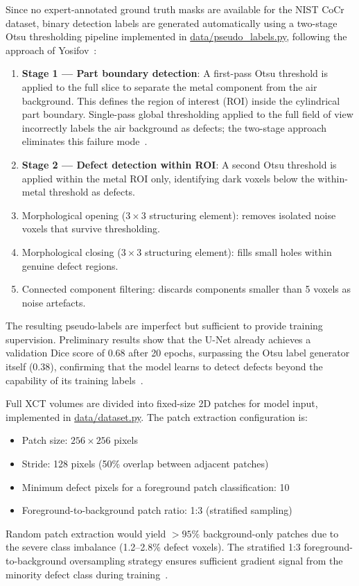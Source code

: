 Since no expert-annotated ground truth masks are available for the NIST CoCr dataset, binary
detection labels are generated automatically using a two-stage Otsu thresholding pipeline implemented
in \url{data/pseudo_labels.py}, following the approach of Yosifov~\citep{Yosifov2020}:
\begin{enumerate}
\item \textbf{Stage 1 --- Part boundary detection}: A first-pass Otsu threshold is applied to the
  full slice to separate the metal component from the air background. This defines the region of
  interest (ROI) inside the cylindrical part boundary. Single-pass global thresholding applied to
  the full field of view incorrectly labels the air background as defects; the two-stage approach
  eliminates this failure mode~\citep{Otsu1979}.
\item \textbf{Stage 2 --- Defect detection within ROI}: A second Otsu threshold is applied within
  the metal ROI only, identifying dark voxels below the within-metal threshold as defects.
\item Morphological opening ($3\times3$ structuring element): removes isolated noise voxels that
  survive thresholding.
\item Morphological closing ($3\times3$ structuring element): fills small holes within genuine
  defect regions.
\item Connected component filtering: discards components smaller than 5 voxels as noise artefacts.
\end{enumerate}
The resulting pseudo-labels are imperfect but sufficient to provide training supervision. Preliminary
results show that the U-Net already achieves a validation Dice score of 0.68 after 20 epochs,
surpassing the Otsu label generator itself (0.38), confirming that the model learns to detect defects
beyond the capability of its training labels~\citep{Yosifov2020}.

Full XCT volumes are divided into fixed-size 2D patches for model input, implemented in
\url{data/dataset.py}. The patch extraction configuration is:
\begin{itemize}
\item Patch size: $256 \times 256$ pixels
\item Stride: 128 pixels (50\% overlap between adjacent patches)
\item Minimum defect pixels for a foreground patch classification: 10
\item Foreground-to-background patch ratio: 1:3 (stratified sampling)
\end{itemize}
Random patch extraction would yield $> 95\%$ background-only patches due to the severe class
imbalance (1.2--2.8\% defect voxels). The stratified 1:3 foreground-to-background oversampling
strategy ensures sufficient gradient signal from the minority defect class during
training~\citep{Sudre2017}.

